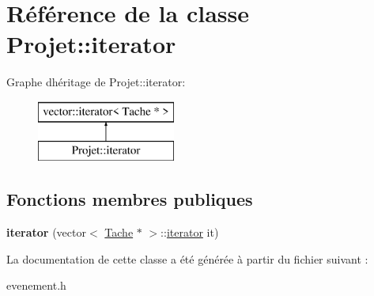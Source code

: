 \hypertarget{class_projet_1_1iterator}{}\section{Référence de la classe Projet\+:\+:iterator}
\label{class_projet_1_1iterator}
Graphe d\textquotesingle{}héritage de Projet\+:\+:iterator\+:\begin{figure}[H]
\begin{center}
\leavevmode
\includegraphics[height=2.000000cm]{class_projet_1_1iterator}
\end{center}
\end{figure}
\subsection*{Fonctions membres publiques}
\begin{DoxyCompactItemize}
\item 
\hypertarget{class_projet_1_1iterator_a1969381a91b0dc84a8bfd11e0c98c023}{}{\bfseries iterator} (vector$<$ \hyperlink{class_tache}{Tache} $\ast$ $>$\+::\hyperlink{class_projet_1_1iterator}{iterator} it)\label{class_projet_1_1iterator_a1969381a91b0dc84a8bfd11e0c98c023}

\end{DoxyCompactItemize}


La documentation de cette classe a été générée à partir du fichier suivant \+:\begin{DoxyCompactItemize}
\item 
evenement.\+h\end{DoxyCompactItemize}
